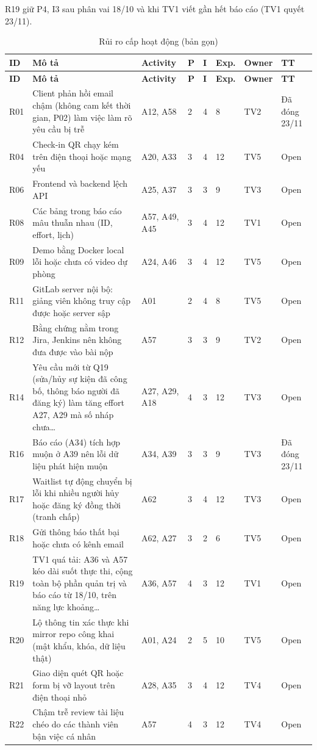R19 giữ P4, I3 sau phân vai 18/10 và khi TV1 viết gần hết báo cáo (TV1 quyết 23/11).

\begingroup\tblsetup\tblzebra
\begin{longtable}{L{0.9cm}L{5.2cm}L{1.8cm}L{0.6cm}L{0.6cm}L{1.0cm}L{1.3cm}L{2.5cm}}
\caption{Rủi ro cấp hoạt động (bản gọn)}\label{tab:risk-activity-ct}\\
\toprule
{}\textbf{ID} & \textbf{Mô tả} & \textbf{Activity} & \textbf{P} & \textbf{I} & \textbf{Exp.} & \textbf{Owner} & \textbf{TT} \\
\midrule
\endfirsthead
\toprule
{}\textbf{ID} & \textbf{Mô tả} & \textbf{Activity} & \textbf{P} & \textbf{I} & \textbf{Exp.} & \textbf{Owner} & \textbf{TT} \\
\midrule
\endhead
\bottomrule
\endlastfoot
R01 & Client phản hồi email chậm (không cam kết thời gian, P02) làm việc làm rõ yêu cầu bị trễ & A12, A58 & 2 & 4 & 8 & TV2 & Đã đóng 23/11 \\
R04 & Check-in QR chạy kém trên điện thoại hoặc mạng yếu & A20, A33 & 3 & 4 & 12 & TV5 & Open \\
R06 & Frontend và backend lệch API & A25, A37 & 3 & 3 & 9 & TV3 & Open \\
R08 & Các bảng trong báo cáo mâu thuẫn nhau (ID, effort, lịch) & A57, A49, A45 & 3 & 4 & 12 & TV1 & Open \\
R09 & Demo bằng Docker local lỗi hoặc chưa có video dự phòng & A24, A46 & 3 & 4 & 12 & TV5 & Open \\
R11 & GitLab server nội bộ: giảng viên không truy cập được hoặc server sập & A01 & 2 & 4 & 8 & TV5 & Open \\
R12 & Bằng chứng nằm trong Jira, Jenkins nên không đưa được vào bài nộp & A57 & 3 & 3 & 9 & TV2 & Open \\
R14 & Yêu cầu mới từ Q19 (sửa/hủy sự kiện đã công bố, thông báo người đã đăng ký) làm tăng effort A27, A29 mà số nháp chưa… & A27, A29, A18 & 4 & 3 & 12 & TV3 & Open \\
R16 & Báo cáo (A34) tích hợp muộn ở A39 nên lỗi dữ liệu phát hiện muộn & A34, A39 & 3 & 3 & 9 & TV3 & Đã đóng 23/11 \\
R17 & Waitlist tự động chuyển bị lỗi khi nhiều người hủy hoặc đăng ký đồng thời (tranh chấp) & A62 & 3 & 4 & 12 & TV3 & Open \\
R18 & Gửi thông báo thất bại hoặc chưa có kênh email & A62, A27 & 3 & 2 & 6 & TV5 & Open \\
R19 & TV1 quá tải: A36 và A57 kéo dài suốt thực thi, cộng toàn bộ phần quản trị và báo cáo từ 18/10, trên năng lực khoảng… & A36, A57 & 4 & 3 & 12 & TV1 & Open \\
R20 & Lộ thông tin xác thực khi mirror repo công khai (mật khẩu, khóa, dữ liệu thật) & A01, A24 & 2 & 5 & 10 & TV5 & Open \\
R21 & Giao diện quét QR hoặc form bị vỡ layout trên điện thoại nhỏ & A28, A35 & 3 & 4 & 12 & TV4 & Open \\
R22 & Chậm trễ review tài liệu chéo do các thành viên bận việc cá nhân & A57 & 4 & 3 & 12 & TV4 & Open \\
\end{longtable}
\endgroup


